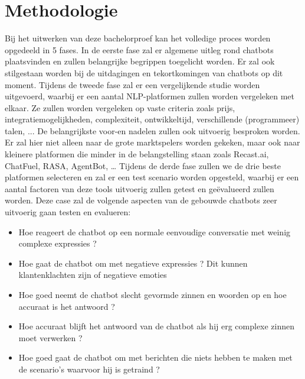 \section{Methodologie}
\label{sec:methodologie}

Bij het uitwerken van deze bachelorproef kan het volledige proces worden opgedeeld in 5 fases.
In de eerste fase zal er algemene uitleg rond chatbots plaatsvinden en zullen belangrijke begrippen toegelicht worden. Er zal ook stilgestaan worden bij de uitdagingen en tekortkomingen van chatbots op dit moment. Tijdens de tweede fase zal er een vergelijkende studie worden uitgevoerd, waarbij er een aantal NLP-platformen zullen worden vergeleken met elkaar. Ze zullen worden vergeleken op vaste criteria zoals prijs, integratiemogelijkheden, complexiteit, ontwikkeltijd, verschillende (programmeer) talen, ... De belangrijkste voor-en nadelen zullen ook uitvoerig besproken worden. Er zal hier niet alleen naar de grote marktspelers worden gekeken, maar ook naar kleinere platformen die minder in de belangstelling staan zoals Recast.ai, ChatFuel, RASA, AgentBot, …
Tijdens de derde fase zullen we de drie beste platformen selecteren en zal er een test scenario worden opgesteld, waarbij er een aantal factoren van deze tools uitvoerig zullen getest en geëvalueerd zullen worden. Deze case zal de volgende aspecten van de gebouwde chatbots zeer uitvoerig gaan testen en evalueren:

\begin{itemize}
    \item Hoe reageert de chatbot op een normale eenvoudige conversatie met weinig complexe expressies ?
    \item Hoe gaat de chatbot om met negatieve expressies ? Dit kunnen klantenklachten zijn of negatieve emoties
    \item Hoe goed neemt de chatbot slecht gevormde zinnen en woorden op en hoe accuraat is het antwoord ?
    \item Hoe accuraat blijft het antwoord van de chatbot als hij erg complexe zinnen moet verwerken ?
    \item Hoe goed gaat de chatbot om met berichten die niets hebben te maken met de scenario’s waarvoor hij is getraind ?
\end{itemize}

